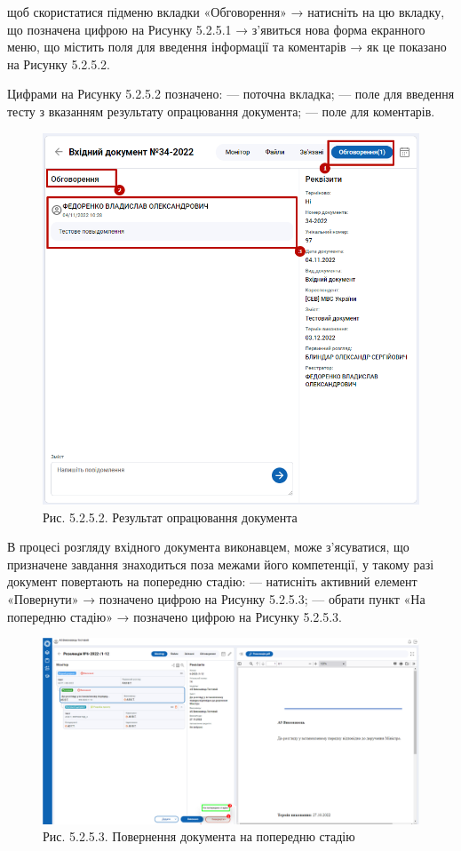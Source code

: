 щоб скористатися підменю вкладки «Обговорення» → натисніть на цю
вкладку, що позначена цифрою  на Рисунку 5.2.5.1 → з'явиться нова
форма екранного меню, що містить поля для введення інформації та
коментарів → як це показано на Рисунку 5.2.5.2.

Цифрами на Рисунку 5.2.5.2 позначено:
 --- поточна вкладка;
 --- поле для введення тесту з вказанням результату опрацювання документа;
 --- поле для коментарів.

\begin{figure}[!htbp]
\centerline{\includegraphics[width=\textwidth]{img/5.2.5.2.png}}
\caption{Рис. 5.2.5.2. Результат опрацювання документа}
\end{figure}

В процесі розгляду вхідного документа виконавцем, може з'ясуватися, що
призначене завдання знаходиться поза межами його компетенції, у такому разі
документ повертають на попередню стадію:
--- натисніть активний елемент «Повернути» → позначено цифрою  на Рисунку 5.2.5.3;
--- обрати пункт «На попередню стадію» → позначено цифрою  на Рисунку 5.2.5.3.

\begin{figure}[!htbp]
\centerline{\includegraphics[width=\textwidth]{img/5.2.5.3.png}}
\caption{Рис. 5.2.5.3. Повернення документа на попередню стадію}
\end{figure}

